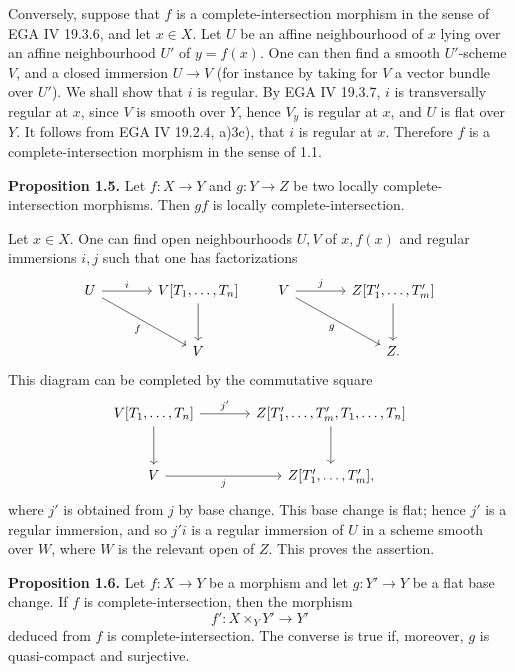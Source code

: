 Conversely, suppose that $f$ is a complete-intersection morphism in the sense of EGA IV 19.3.6, and let $x\in X$. Let $U$ be an affine neighbourhood of $x$ lying over an affine neighbourhood $U'$ of $y=f(x)$. One can then find a smooth $U'$-scheme $V$, and a closed immersion $U\to V$ (for instance by taking for $V$ a vector bundle over $U'$). We shall show that $i$ is regular. By EGA IV 19.3.7, $i$ is transversally regular at $x$, since $V$ is smooth over $Y$, hence $V_y$ is regular at $x$, and $U$ is flat over $Y$. It follows from EGA IV 19.2.4, a)3c), that $i$ is regular at $x$. Therefore $f$ is a complete-intersection morphism in the sense of 1.1.

\textbf{Proposition 1.5.} Let $f:X\to Y$ and $g:Y\to Z$ be two locally complete-intersection morphisms. Then $gf$ is locally complete-intersection.

Let $x\in X$. One can find open neighbourhoods $U,V$ of $x,f(x)$ and regular immersions $i,j$ such that one has factorizations
\[
\begin{tikzcd}[column sep=large,row sep=large]
U \arrow[r,"i"] \arrow[dr,"f"'] & V[T_1,\ldots,T_n] \arrow[d]\\
& V
\end{tikzcd}
\qquad
\begin{tikzcd}[column sep=large,row sep=large]
V \arrow[r,"j"] \arrow[dr,"g"'] & Z[T'_1,\ldots,T'_m] \arrow[d]\\
& Z.
\end{tikzcd}
\]
This diagram can be completed by the commutative square
\[
\begin{tikzcd}[column sep=large,row sep=large]
V[T_1,\ldots,T_n] \arrow[r,"j'"] \arrow[d] & Z[T'_1,\ldots,T'_m,T_1,\ldots,T_n] \arrow[d]\\
V \arrow[r,"j"'] & Z[T'_1,\ldots,T'_m],
\end{tikzcd}
\]
where $j'$ is obtained from $j$ by base change. This base change is flat; hence $j'$ is a regular immersion, and so $j'i$ is a regular immersion of $U$ in a scheme smooth over $W$, where $W$ is the relevant open of $Z$. This proves the assertion.

\textbf{Proposition 1.6.} Let $f:X\to Y$ be a morphism and let $g:Y'\to Y$ be a flat base change. If $f$ is complete-intersection, then the morphism
\[
f':X\times_Y Y'\longrightarrow Y'
\]
deduced from $f$ is complete-intersection. The converse is true if, moreover, $g$ is quasi-compact and surjective.

